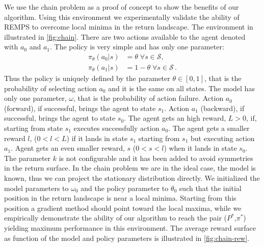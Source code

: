 We use the chain problem as a proof of concept to show the benefits of our algorithm. Using this environment we experimentally validate the ability of REMPS to overcome local minima in the return landscape. \newline The environment in illustrated in \cref{fig:chain}. There are two actions available to the agent denoted with $a_0$ and $a_1$. The policy is very simple and has only one parameter:
\begin{align}
	\pi_\theta(a_0 | s) &=  \theta \; \forall s \in \mathcal{S}, \\
	\pi_\theta(a_1 | s) &=  1 - \theta \; \forall s \in \mathcal{S} \, .
\end{align}
Thus the policy is uniquely defined by the parameter $\theta \in [0,1]$, that is the probability of selecting action $a_0$ and it is the same on all states.
The model has only one parameter, $\omega$, that is the probability of action failure.
Action $a_0$ (forward), if successful, brings the agent to state $s_1$. Action $a_1$ (backward), if successful, brings the agent to state $s_0$.
The agent gets an high reward, $L > 0$, if, starting from state $s_1$ executes successfully action $a_0$. The agent gets a smaller reward $l $, ($0 < l < L$) if it lands in state $s_1$ starting from $s_1$ but executing action $a_1$. Agent gets an even smaller reward, $s$ ($0 < s < l$) when it lands in state $s_0$. The parameter $k$ is not configurable and it has been added to avoid symmetries in the return surface. In the chain problem we are in the ideal case, the model is known, thus we can project the stationary distribution directly.
We initialized the model parameters to $\omega_0$ and the policy parameter to $\theta_0$ such that the initial position in the return landscape is near a local minima. Starting from this position a gradient method should point toward the local maxima, while we empirically demonstrate the ability of our algorithm to reach the pair ($P^*$,$\pi^*$) yielding maximum performance in this environment. The average reward surface as function of the model and policy parameters is illustrated in \cref{fig:chain-rew}. \newline
